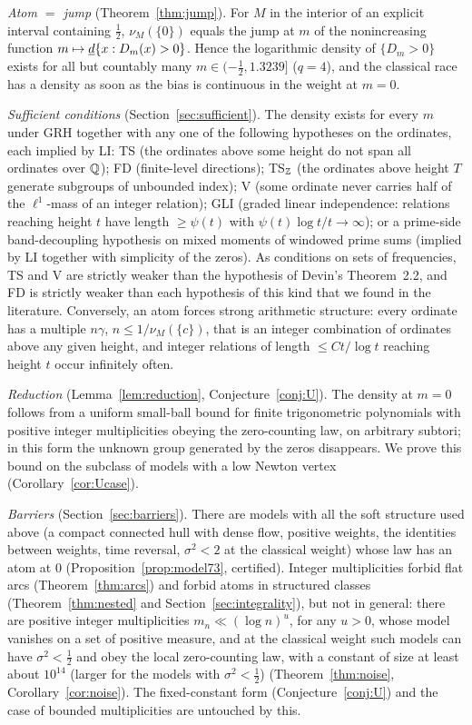 \emph{Atom $=$ jump} (Theorem~\ref{thm:jump}). For $M$ in the interior of an explicit interval containing $\frac12$, $\nu_M(\{0\})$ equals the jump at $m$ of the nonincreasing function $m\mapsto\underline d\{x:D_m(x)>0\}$. Hence the logarithmic density of $\{D_m>0\}$ exists for all but countably many $m\in(-\frac12,1.3239]$ ($q=4$), and the classical race has a density as soon as the bias is continuous in the weight at $m=0$.

\emph{Sufficient conditions} (Section~\ref{sec:sufficient}). The density exists for every $m$ under GRH together with any one of the following hypotheses on the ordinates, each implied by LI: TS (the ordinates above some height do not span all ordinates over $\mathbb Q$); FD (finite-level directions); TS$_\mathbb Z$ (the ordinates above height $T$ generate subgroups of unbounded index); V (some ordinate never carries half of the $\ell^1$-mass of an integer relation); GLI (graded linear independence: relations reaching height $t$ have length $\ge\psi(t)$ with $\psi(t)\log t/t\to\infty$); or a prime-side band-decoupling hypothesis on mixed moments of windowed prime sums (implied by LI together with simplicity of the zeros). As conditions on sets of frequencies, TS and V are strictly weaker than the hypothesis of Devin's Theorem~2.2, and FD is strictly weaker than each hypothesis of this kind that we found in the literature. Conversely, an atom forces strong arithmetic structure: every ordinate has a multiple $n\gamma$, $n\le1/\nu_M(\{c\})$, that is an integer combination of ordinates above any given height, and integer relations of length $\le Ct/\log t$ reaching height $t$ occur infinitely often.

\emph{Reduction} (Lemma~\ref{lem:reduction}, Conjecture~\ref{conj:U}). The density at $m=0$ follows from a uniform small-ball bound for finite trigonometric polynomials with positive integer multiplicities obeying the zero-counting law, on arbitrary subtori; in this form the unknown group generated by the zeros disappears. We prove this bound on the subclass of models with a low Newton vertex (Corollary~\ref{cor:Ucase}).

\emph{Barriers} (Section~\ref{sec:barriers}). There are models with all the soft structure used above (a compact connected hull with dense flow, positive weights, the identities between weights, time reversal, $\sigma^2<2$ at the classical weight) whose law has an atom at $0$ (Proposition~\ref{prop:model73}, certified). Integer multiplicities forbid flat arcs (Theorem~\ref{thm:arcs}) and forbid atoms in structured classes (Theorem~\ref{thm:nested} and Section~\ref{sec:integrality}), but not in general: there are positive integer multiplicities $m_n\ll(\log n)^u$, for any $u>0$, whose model vanishes on a set of positive measure, and at the classical weight such models can have $\sigma^2<\frac12$ and obey the local zero-counting law, with a constant of size at least about $10^{14}$ (larger for the models with $\sigma^2<\frac12$) (Theorem~\ref{thm:noise}, Corollary~\ref{cor:noise}). The fixed-constant form (Conjecture~\ref{conj:U}) and the case of bounded multiplicities are untouched by this.


